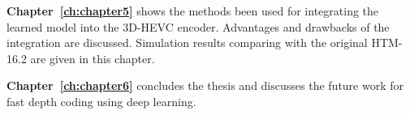 \textbf{Chapter~\ref{ch:chapter5}} shows the methods been used for integrating
the learned model into the 3D-HEVC encoder.
Advantages and drawbacks of the integration are discussed.
Simulation results comparing with the original HTM-16.2 are given in this
chapter.

\textbf{Chapter~\ref{ch:chapter6}} concludes the thesis and discusses the future
work for fast depth coding using deep learning.



%
%

